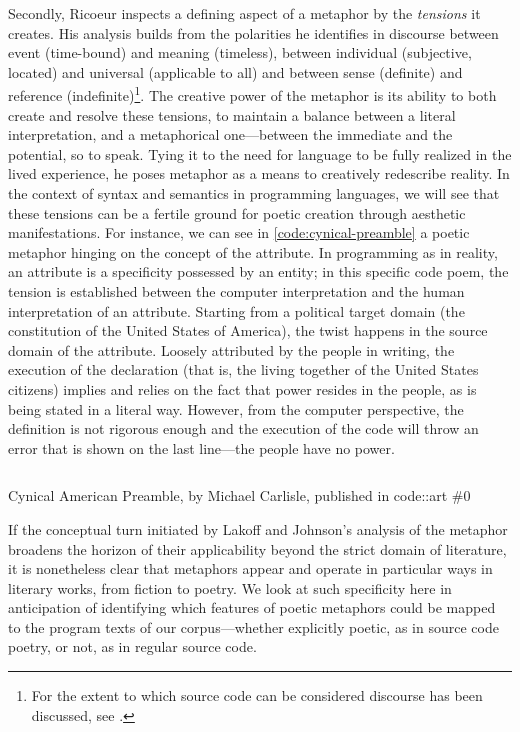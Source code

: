 Secondly, Ricoeur inspects a defining aspect of a metaphor by the \emph{tensions} it creates. His analysis builds from the polarities he identifies in discourse between event (time-bound) and meaning (timeless), between individual (subjective, located) and universal (applicable to all) and between sense (definite) and reference (indefinite)\footnote{For the extent to which source code can be considered discourse has been discussed, see \citep{cox_speaking_2013}.}. The creative power of the metaphor is its ability to both create and resolve these tensions, to maintain a balance between a literal interpretation, and a metaphorical one—between the immediate and the potential, so to speak. Tying it to the need for language to be fully realized in the lived experience, he poses metaphor as a means to creatively redescribe reality. In the context of syntax and semantics in programming languages, we will see that these tensions can be a fertile ground for poetic creation through aesthetic manifestations. For instance, we can see in \ref{code:cynical-preamble} a poetic metaphor hinging on the concept of the attribute. In programming as in reality, an attribute is a specificity possessed by an entity; in this specific code poem, the tension is established between the computer interpretation and the human interpretation of an attribute. Starting from a political target domain (the constitution of the United States of America), the twist happens in the source domain of the attribute. Loosely attributed by the people in writing, the execution of the declaration (that is, the living together of the United States citizens) implies and relies on the fact that power resides in the people, as is being stated in a literal way. However, from the computer perspective, the definition is not rigorous enough and the execution of the code will throw an error that is shown on the last line—the people have no power.

\begin{listing}
    \inputminted[]{python}{./corpus/cynical_american_preamble.py}
    \caption{Cynical American Preamble, by Michael Carlisle, published in code::art \#0 \citep{brand_code_2019}}
    \label{code:cynical-preamble}
\end{listing}

If the conceptual turn initiated by Lakoff and Johnson's analysis of the metaphor broadens the horizon of their applicability beyond the strict domain of literature, it is nonetheless clear that metaphors appear and operate in particular ways in literary works, from fiction to poetry. We look at such specificity here in anticipation of identifying which features of poetic metaphors could be mapped to the program texts of our corpus—whether explicitly poetic, as in source code poetry, or not, as in regular source code.

